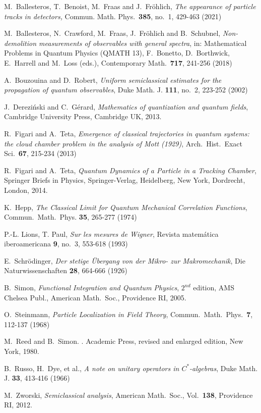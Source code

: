 \documentclass[12pt]{article}
\begin{document}
\begin{thebibliography}{9999}

 M.~Ballesteros, T.~Benoist, M.~Fraas and J.~Fr\"{o}hlich, \textit{The appearance of particle tracks in detectors,} Commun. Math. Phys.~\textbf{385}, no.~1, 429-463 (2021)

 M.~Ballesteros, N.~Crawford, M.~Fraas, J.~Fr\"ohlich and B.~Schubnel, \textit{Non-demolition
measurements of observables with general spectra}, in: Mathematical Problems in Quantum Physics (QMATH 13), 
F.~Bonetto, D.~Borthwick, E.~Harrell and M.~Loss (eds.), Contemporary Math.~{\bf{717}}, 241-256 (2018)

 A.~Bouzouina and D.~Robert, \textit{Uniform semiclassical estimates for the propagation of quantum observables}, Duke Math. J. {\bf{111}}, no.~2, 223-252 (2002)

 J.~Dereziński and C.~Gérard, \textit{Mathematics of quantization and quantum fields}, Cambridge University Press, Cambridge UK, 2013.

 R.~Figari and A.~Teta, \textit{Emergence of classical trajectories in quantum systems: the cloud chamber problem in the analysis of Mott (1929)}, Arch.~Hist.~Exact Sci.~{\bf{67}}, 215-234 (2013)

 R.~Figari and A.~Teta, \textit{Quantum Dynamics of a Particle in a Tracking Chamber}, Springer Briefs in Physics, Springer-Verlag, Heidelberg, New York, Dordrecht, London, 2014.

 K.~Hepp, \textit{The Classical Limit for Quantum Mechanical Correlation Functions}, Commun.~Math.~Phys. {\bf{35}}, 265-277 (1974)

 P.-L. Lions, T. Paul, \textit{Sur les mesures de Wigner}, Revista matem\'atica iberoamericana {\bf{9}}, no.~3, 553-618 (1993)

 E.~Schr\"odinger, \textit{Der stetige \"Ubergang von der Mikro- zur Makromechanik}, Die Naturwissenschaften {\bf{28}}, 664-666 (1926)

 B.~Simon, \textit{Functional Integration and Quantum Physics}, $2^{nd}$ edition, AMS Chelsea Publ., American Math.~Soc., Providence RI, 2005.

 O.~Steinmann, \textit{Particle Localization in Field Theory}, Commun.~Math.~Phys.~{\bf{7}}, 112-137 (1968)

M.~Reed and B.~Simon.
.
\newblock Academic Press, revised and enlarged edition, New York, 1980.

 B.~Russo, H.~Dye, et al., \textit{A note on unitary operators in $C^{*}$-algebras}, Duke Math. J. {\bf{33}}, 413-416 (1966)

 M.~Zworski, \textit{Semiclassical analysis}, American Math.~Soc., Vol.~{\bf{138}}, Providence RI, 2012.


\end{thebibliography}
\end{document}
